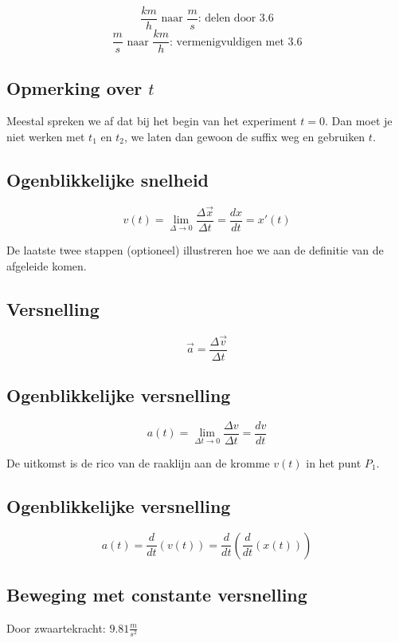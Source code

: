 \[\frac{km}{h} \textrm{ naar } \frac{m}{s} \textrm{: delen door } 3.6\]
\[\frac{m}{s} \textrm{ naar } \frac{km}{h} \textrm{: vermenigvuldigen met } 3.6\]

\subsection{Opmerking over \(t\)}

Meestal spreken we af dat bij het begin van het experiment \(t = 0\). Dan moet je niet werken met \(t_1\) en \(t_2\), we laten dan gewoon de suffix weg en gebruiken \(t\).

\subsection{Ogenblikkelijke snelheid}

\[
v(t) = \lim_{\Delta \to 0}{\frac{\Delta \vec{x}}{\Delta t}} = \frac{dx}{dt} = x'(t)
\]

De laatste twee stappen (optioneel) illustreren hoe we aan de definitie van de afgeleide komen.

\subsection{Versnelling}

\[\vec{a} = \frac{\Delta \vec{v}}{\Delta t} \]

\subsection{Ogenblikkelijke versnelling}

\[ a(t) = \lim_{\Delta t \to 0}{\frac{\Delta v}{\Delta t}} = \frac{dv}{dt} \]

De uitkomst is de rico van de raaklijn aan de kromme \(v(t)\) in het punt \(P_1\).

\subsection{Ogenblikkelijke versnelling}

\[
a(t) = \frac{d}{dt} (v(t)) = \frac{d}{dt} (\frac{d}{dt} (x(t)))
\]

\subsection{Beweging met constante versnelling}

Door zwaartekracht: \(9.81 \frac{m}{s^2}\)

